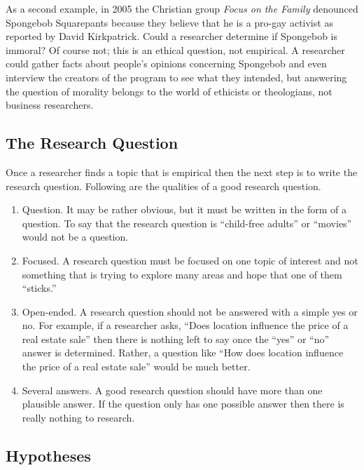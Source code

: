 As a second example, in 2005 the Christian group \textit{Focus on the Family} denounced Spongebob Squarepants because they believe that he is a pro-gay activist as reported by David Kirkpatrick\cite{kirkpatrick2005conservatives}. Could a researcher determine if Spongebob is immoral? Of course not; this is an ethical question, not empirical. A researcher could gather facts about people's opinions concerning Spongebob and even interview the creators of the program to see what they intended, but answering the question of morality belongs to the world of ethicists or theologians, not business researchers.

\subsection{The Research Question}

Once a researcher finds a topic that is empirical then the next step is to write the research question. Following are the qualities of a good research question.

\begin{enumerate}
	\item Question. It may be rather obvious, but it must be written in the form of a question. To say that the research question is ``child-free adults'' or ``movies'' would not be a question. 
	\item Focused. A research question must be focused on one topic of interest and not something that is trying to explore many areas and hope that one of them ``sticks.''
	\item Open-ended. A research question should not be answered with a simple yes or no. For example, if a researcher asks, ``Does location influence the price of a real estate sale'' then there is nothing left to say once the ``yes'' or ``no'' answer is determined. Rather, a question like ``How does location influence the price of a real estate sale'' would be much better.
	\item Several answers. A good research question should have more than one plausible answer. If the question only has one possible answer then there is really nothing to research.
\end{enumerate}

\subsection{Hypotheses}

